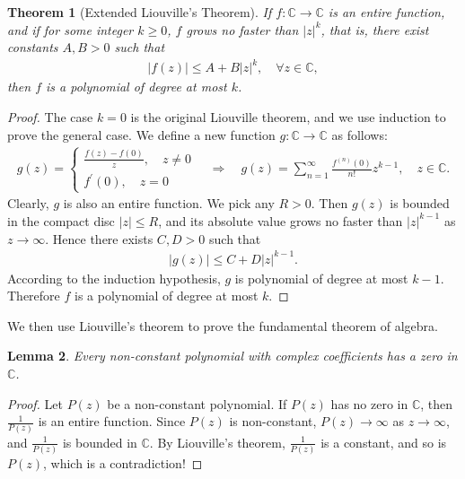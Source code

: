 \documentclass{article}
\numberwithin{equation}{section}
\newcommand{\bbC}{\mathbb{C}}
\theoremstyle{plain}
\newtheorem{theorem}{Theorem}[section]
\newtheorem{lemma}[theorem]{Lemma}
\theoremstyle{definition}
\begin{document}
\begin{theorem}[Extended Liouville's Theorem]\label{extliouvillethm}
If $f:\bbC\to\bbC$ is an entire function, and if for some integer $k\geq 0$, $f$ grows no faster than $\vert z\vert^k$, that is, there exist constants $A,B>0$ such that
\begin{align*}
	\vert f(z)\vert\leq A+B\vert z\vert^k,\quad\forall z\in\bbC,
\end{align*}
then $f$ is a polynomial of degree at most $k$.
\end{theorem}
\begin{proof}
The case $k=0$ is the original Liouville theorem, and we use induction to prove the general case. We define a new function $g:\bbC\to\bbC$ as follows:
\begin{align*}
	g(z)=\begin{cases}
		\frac{f(z)-f(0)}{z},\quad z\neq 0\\
		f^\prime(0),\quad z=0
	\end{cases}\quad\Rightarrow\quad g(z)=\sum_{n=1}^\infty\frac{f^{(n)}(0)}{n!}z^{k-1},\quad z\in\bbC.
\end{align*}
Clearly, $g$ is also an entire function. We pick any $R>0$. Then $g(z)$ is bounded in the compact disc $\vert z\vert\leq R$, and its absolute value grows no faster than $\vert z\vert^{k-1}$ as $z\to\infty$. Hence there exists $C,D>0$ such that
\begin{align*}
	\vert g(z)\vert\leq C+D\vert z\vert^{k-1}.
\end{align*}
According to the induction hypothesis, $g$ is polynomial of degree at most $k-1$. Therefore $f$ is a polynomial of degree at most $k$.
\end{proof}

We then use Liouville's theorem to prove the fundamental theorem of algebra.
\begin{lemma}\label{lemmafundalge}
Every non-constant polynomial with complex coefficients has a zero in $\bbC$.
\end{lemma}
\begin{proof}
Let $P(z)$ be a non-constant polynomial. If $P(z)$ has no zero in $\bbC$, then $\frac{1}{P(z)}$ is an entire function. Since $P(z)$ is non-constant, $P(z)\to\infty$ as $z\to\infty$, and $\frac{1}{P(z)}$ is bounded in $\bbC$. By Liouville's theorem, $\frac{1}{P(z)}$ is a constant, and so is $P(z)$, which is a contradiction!
\end{proof}
\end{document}

